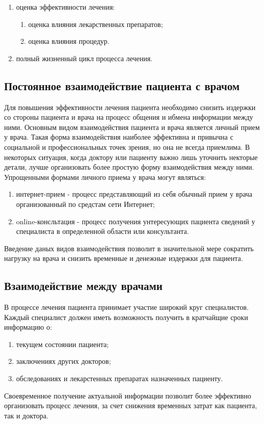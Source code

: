 \begin{enumerate}
	\item оценка эффективности лечения:
		\begin{enumerate}
			\item оценка влияния лекарственных препаратов;
			\item оценка влияния процедур.
		\end{enumerate}
	\item полный жизненный цикл процесса лечения.
\end{enumerate}

\subsection{Постоянное взаимодействие пациента с врачом}

Для повышения эффективности лечения пациента необходимо снизить издержки со
стороны пациента и врача на процесс общения и ибмена информации между ними.
Основным видом взаимодействия пациента и врача является личный прием у врача.
Такая форма взаимодействия наиболее эффективна и привычна с социальной и
профессиональных точек зрения, но она не всегда приемлима. В некоторых ситуация,
когда доктору или пациенту важно лишь уточнить некторые детали, лучше
организовать более простую форму взаимодействия между ними. Упрощенными формами
личного приема у врача могут являться:

\begin{enumerate}
  	\item интернет-прием - процесс представляющий из себя обычный прием у врача
организованный по средстам сети Интернет;
	\item  online-консльтация - процесс получения
унтересующих пациента сведений у специалиста в определенной области или
консультанта.
\end{enumerate}
 
Введение даных видов взаимодействия позволит в значительной мере сократить
нагрузку на врача и снизить временные и денежные издержки для пациента.

\subsection{Взаимодействие между врачами}

В процессе лечения пациента принимает участие широкий круг специалистов. Каждый
специалист должен иметь возможность получить в кратчайщие сроки информацию о:

\begin{enumerate}
	\item текущем состоянии пациента;
	\item заключениях других докторов;
	\item обследованиях и лекарстенных препаратах назначенных пациенту.
\end{enumerate}

Своевременное получение актуальной информации позволит более эффективно
организовать процесс лечения, за счет снижения временных затрат как пациента,
так и доктора.
